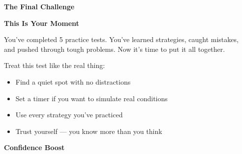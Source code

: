 \clearpage
\thispagestyle{empty}
{\sffamily

\begin{center}
{\fontsize{22}{26}\selectfont\bfseries\color{funPink} \faTrophy\hspace{3mm}The Final Challenge\hspace{3mm}\faTrophy}

\vspace{2mm}
{\color{funGray}\hrulefill}
\end{center}

\vspace{3mm}

\begin{tcolorbox}[
    enhanced,
    colback=funPinkLight,
    colframe=funPink!50,
    arc=10pt,
    boxrule=1.5pt,
    left=6mm, right=6mm, top=5mm, bottom=5mm,
]
{\large\bfseries\color{funPinkDark} \faRocket\hspace{2mm}This Is Your Moment}

\vspace{2mm}

You've completed 5 practice tests. You've learned strategies, caught mistakes, and pushed through tough problems. Now it's time to put it all together.

\vspace{3mm}

Treat this test like the real thing:

\begin{itemize}[leftmargin=6mm, itemsep=3pt]
    \item[\textcolor{funPink}{\faStar}] Find a quiet spot with no distractions
    \item[\textcolor{funPink}{\faStar}] Set a timer if you want to simulate real conditions
    \item[\textcolor{funPink}{\faStar}] Use every strategy you've practiced
    \item[\textcolor{funPink}{\faStar}] Trust yourself — you know more than you think
\end{itemize}
\end{tcolorbox}

\vspace{3mm}

\begin{tcolorbox}[
    enhanced,
    colback=funYellowLight,
    colframe=funYellow!60,
    arc=10pt,
    boxrule=1pt,
    left=6mm, right=6mm, top=4mm, bottom=4mm,
]
{\bfseries\color{funYellowDark} \faLightbulb\hspace{2mm}Confidence Boost}


\end{tcolorbox}}
